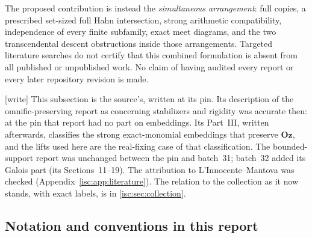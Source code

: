 \documentclass[11pt,letterpaper]{article}
\theoremstyle{definition}
\theoremstyle{remark}
\newcommand{\Oz}{\mathbf{Oz}}
\newcommand{\wtag}{\textup{[write]}}%
\numberwithin{equation}{section}
\begin{document}
The proposed contribution is instead the \emph{simultaneous arrangement}:
full copies, a prescribed set-sized full Hahn intersection, strong
arithmetic compatibility, independence of every finite subfamily, exact meet
diagrams, and the two transcendental descent obstructions inside those
arrangements. Targeted literature searches do not certify that this combined
formulation is absent from all published or unpublished work. No claim of
having audited every report or every later repository revision is made.

\wtag{} This subsection is the source's, written at its pin. Its
description of the omnific-preserving report as concerning stabilizers and
rigidity was accurate then: at the pin that report had no part on
embeddings. Its Part~III, written afterwards, classifies the strong
exact-monomial embeddings that preserve $\Oz$, and the lifts used here are
the real-fixing case of that classification. The bounded-support report was
unchanged between the pin and batch~31; batch~32 added its Galois part (its
Sections~11--19). The attribution to L'Innocente--Mantova was checked
(Appendix~\ref{isc:app:literature}). The relation to the collection as it
now stands, with exact labels, is in \cref{isc:sec:collection}.

\subsection{Notation and conventions in this report}
\label{isc:sec:conventions}
\end{document}
